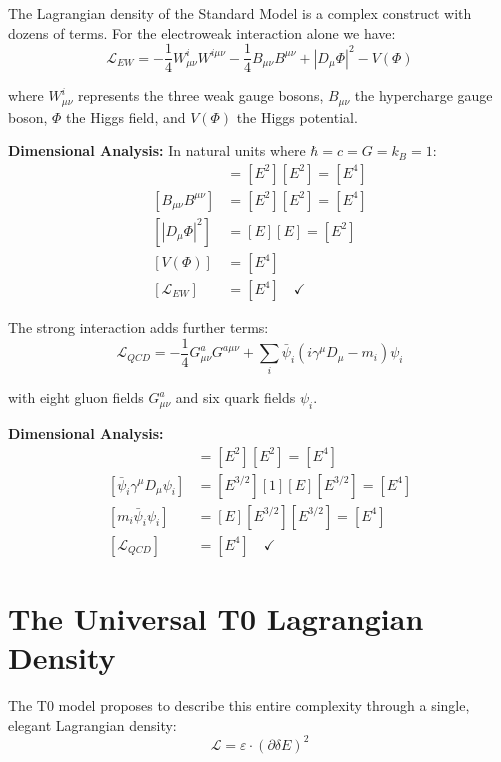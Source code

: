 \documentclass[12pt,a4paper]{report}
\newcommand{\natunits}{\hbar = c = G = k_B = 1} %
\begin{document}
	The Lagrangian density of the Standard Model is a complex construct with dozens of terms. For the electroweak interaction alone we have:
	\begin{equation}
		\mathcal{L}_{EW} = -\frac{1}{4} W_{\mu\nu}^i W^{i\mu\nu} - \frac{1}{4} B_{\mu\nu}B^{\mu\nu} + |D_\mu\Phi|^2 - V(\Phi)
	\end{equation}
	
	where $W_{\mu\nu}^i$ represents the three weak gauge bosons, $B_{\mu\nu}$ the hypercharge gauge boson, $\Phi$ the Higgs field, and $V(\Phi)$ the Higgs potential.
	
	\textbf{Dimensional Analysis:} In natural units where $\natunits$:
	\begin{align}
		[W_{\mu\nu}^i W^{i\mu\nu}] &= [E^2][E^2] = [E^4] \\
		[B_{\mu\nu}B^{\mu\nu}] &= [E^2][E^2] = [E^4] \\
		[|D_\mu\Phi|^2] &= [E][E] = [E^2] \\
		[V(\Phi)] &= [E^4] \\
		[\mathcal{L}_{EW}] &= [E^4] \quad \checkmark
	\end{align}
	
	The strong interaction adds further terms:
	\begin{equation}
		\mathcal{L}_{QCD} = -\frac{1}{4} G_{\mu\nu}^a G^{a\mu\nu} + \sum_i \bar{\psi}_i(i\gamma^\mu D_\mu - m_i)\psi_i
	\end{equation}
	
	with eight gluon fields $G_{\mu\nu}^a$ and six quark fields $\psi_i$.
	
	\textbf{Dimensional Analysis:}
	\begin{align}
		[G_{\mu\nu}^a G^{a\mu\nu}] &= [E^2][E^2] = [E^4] \\
		[\bar{\psi}_i\gamma^\mu D_\mu\psi_i] &= [E^{3/2}][1][E][E^{3/2}] = [E^4] \\
		[m_i\bar{\psi}_i\psi_i] &= [E][E^{3/2}][E^{3/2}] = [E^4] \\
		[\mathcal{L}_{QCD}] &= [E^4] \quad \checkmark
	\end{align}
	
	\section{The Universal T0 Lagrangian Density}
	
	The T0 model proposes to describe this entire complexity through a single, elegant Lagrangian density:
	\begin{equation}
		\boxed{\mathcal{L} = \varepsilon \cdot (\partial\delta E)^2}
		\label{eq:universal_lagrangian}
	\end{equation}
	
\end{document}
